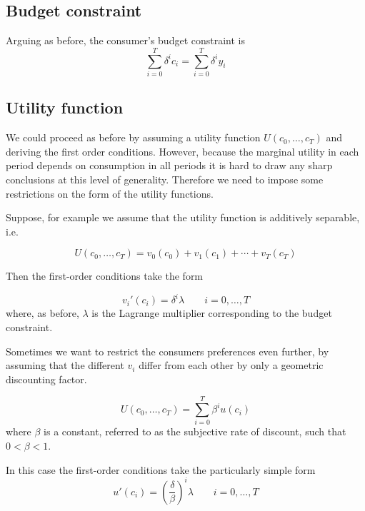 \documentclass[11pt,reqno,openany]{amsbook}
\begin{document}
\subsection{Budget constraint}
Arguing as before, the consumer's budget constraint is
\begin{equation}\label{eq:many-period-budget}
\sum_{i=0}^T \delta^i c_i = \sum_{i=0}^T \delta^i y_i
\end{equation}

\subsection{Utility function}
We could proceed as before by assuming a utility function
$U(c_0,\ldots,c_T)$ and deriving the first order conditions. However,
because the marginal utility in each period depends on consumption in
all periods it is hard to draw any sharp conclusions at this level of
generality. Therefore we need to impose some restrictions on the form
of the utility functions.

Suppose, for example we assume that the utility function is additively
separable, i.e.

\begin{equation}\label{eq:utility-addsep}
U(c_0,\ldots,c_T)=v_0(c_0)+v_1(c_1)+\cdots+v_T(c_T)
\end{equation}

Then the first-order conditions take the form

\begin{equation}\label{eq:foc-additively-separable}
v_i'(c_i) = \delta^i \lambda \qquad i=0,\ldots,T
\end{equation}
where, as before, $\lambda$ is the Lagrange multiplier corresponding
to the budget constraint.

Sometimes we want to restrict the consumers preferences even further,
by assuming that the different $v_i$ differ from each other by only a
geometric discounting factor.

\begin{equation}\label{eq:utility-geometric}
U(c_0,\ldots,c_T)=\sum_{i=0}^T \beta^i u(c_i)
\end{equation}
where $\beta$ is a constant, referred to as the subjective rate of
discount, such that $0<\beta<1$.  

In this case the first-order conditions take the particularly simple
form
\begin{equation}\label{eq:foc-stationary}
u'(c_i)=\left(\frac{\delta}{\beta}\right)^i \lambda \qquad i=0,\ldots,T
\end{equation}
\end{document}
